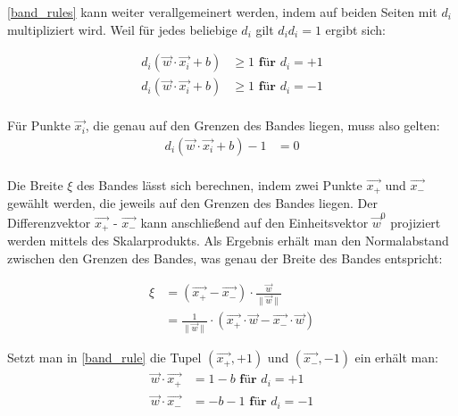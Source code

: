 \documentclass[a4paper,11pt,twoside]{scrreprt}
\begin{document}
\autoref{band_rules} kann weiter verallgemeinert werden, indem auf beiden Seiten mit $d_{i}$ multipliziert wird. Weil für jedes beliebige $d_{i}$ gilt $d_{i} d_{i} = 1$ ergibt sich:

\begin{equation} \label{band_rule}
    \begin{aligned}
    d_{i} (\vec{w} \cdot \vec{x_{i}} + b) & \geq 1 \textbf{ für $d_{i} = +1$}\\
    d_{i} (\vec{w} \cdot \vec{x_{i}} + b) & \geq 1 \textbf{ für $d_{i} = -1$}\\
    \end{aligned}
\end{equation}

Für Punkte $\vec{x_{i}}$, die genau auf den Grenzen des Bandes liegen, muss also gelten:
\begin{equation} \label{band_rule}
    \begin{aligned}
    d_{i} (\vec{w} \cdot \vec{x_{i}} + b) -1 &= 0\\
    \end{aligned}
\end{equation}

Die Breite $\xi$ des Bandes lässt sich berechnen, indem zwei Punkte $\vec{x_{+}}$ und $\vec{x_{-}}$ gewählt werden, die jeweils auf den Grenzen des Bandes liegen. Der Differenzvektor $\vec{x_{+}}$ - $\vec{x_{-}}$ kann anschließend auf den Einheitsvektor $\vec{w}^{0}$ projiziert werden mittels des Skalarprodukts. Als Ergebnis erhält man den Normalabstand zwischen den Grenzen des Bandes, was genau der Breite des Bandes entspricht:

\begin{equation} \label{band_width}
    \begin{aligned}
    \xi &= (\vec{x_{+}} - \vec{x_{-}}) \cdot \frac{\vec{w}}{\lVert \vec{w} \rVert}\\
    &=  \frac{1}{\lVert \vec{w} \rVert} \cdot (\vec{x_{+}} \cdot \vec{w} - \vec{x_{-}} \cdot \vec{w})
    \end{aligned}
\end{equation}

Setzt man in \autoref{band_rule} die Tupel $(\vec{x_{+}}, +1)$ und $(\vec{x_{-}}, -1)$ ein erhält man:
\begin{equation} \label{band_width_x}
    \begin{aligned}
     \vec{w} \cdot \vec{x_{+}} &= 1 -b \textbf{ für $d_{i} = +1$}\\
     \vec{w} \cdot \vec{x_{-}} &= -b -1 \textbf{ für $d_{i} = -1$}\\
    \end{aligned}
\end{equation}
\end{document}
